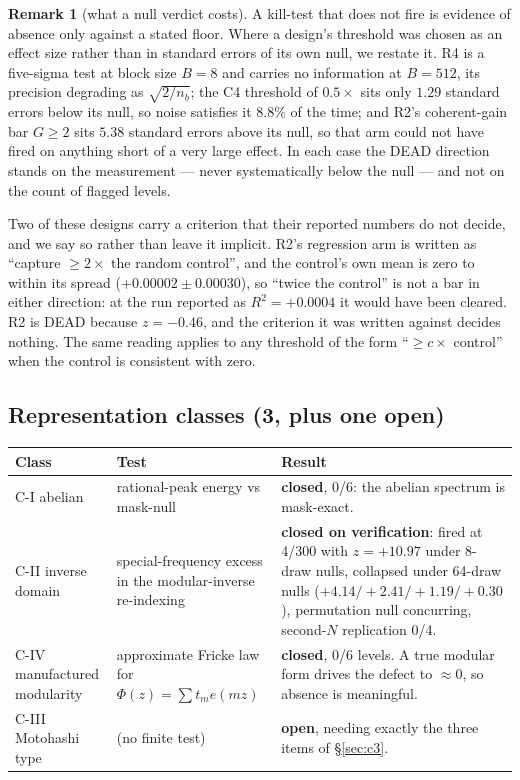 \documentclass[11pt,a4paper]{article}
\theoremstyle{plain}
\theoremstyle{definition}
\newtheorem{remark}[theorem]{Remark}
\begin{document}
\begin{remark}[what a null verdict costs]
A kill-test that does not fire is evidence of absence only against a
stated floor. Where a design's threshold was chosen as an effect size
rather than in standard errors of its own null, we restate it. R4 is a
five-sigma test at block size $B=8$ and carries no information at
$B=512$, its precision degrading as $\sqrt{2/n_b}$; the C4
threshold of $0.5\times$ sits only $1.29$ standard errors below its
null, so noise satisfies it $8.8\%$ of the time; and R2's
coherent-gain bar $G\ge2$ sits $5.38$ standard errors above its null,
so that arm could not have fired on anything short of a very large
effect. In each case the DEAD direction stands on the measurement ---
never systematically below the null --- and not on the count of
flagged levels.

Two of these designs carry a criterion that their reported numbers do
not decide, and we say so rather than leave it implicit. R2's
regression arm is written as ``capture $\ge 2\times$ the random
control'', and the control's own mean is zero to within its spread
($+0.00002 \pm 0.00030$), so ``twice the control'' is not a bar in
either direction: at the run reported as $R^2 = +0.0004$ it would have
been cleared. R2 is DEAD because $z = -0.46$, and the criterion it was
written against decides nothing. The same reading applies to any
threshold of the form ``$\ge c\times$ control'' when the control is
consistent with zero.
\end{remark}

\subsection{Representation classes (3, plus one open)}

\begin{longtable}{p{}p{}p{}}
\hline
Class & Test & Result\\
\hline
\endhead
C-I abelian & rational-peak energy vs mask-null &
 \textbf{closed}, 0/6: the abelian spectrum is mask-exact.\\
C-II inverse domain & special-frequency excess in the
 modular-inverse re-indexing &
 \textbf{closed on verification}: fired at 4/300 with $z = +10.97$
 under 8-draw nulls, collapsed under 64-draw nulls
 ($+4.14/+2.41/+1.19/+0.30$), permutation null concurring, second-$N$
 replication 0/4.\\
C-IV manufactured modularity & approximate Fricke law for
 $\Phi(z) = \sum t_m e(mz)$ &
 \textbf{closed}, 0/6 levels. A true modular form drives the defect to
 $\approx 0$, so absence is meaningful.\\
C-III Motohashi type & (no finite test) &
 \textbf{open}, needing exactly the three items of \S\ref{sec:c3}.\\
\hline
\end{longtable}
\end{document}
